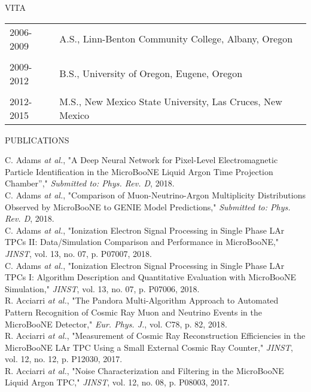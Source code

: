 \begin{center}
            VITA
\end{center}
\begin{flushleft}
\begin{tabular}{ll}
2006-2009        &  A.S., Linn-Benton Community College, Albany, Oregon
\\
& \\
2009-2012        &  B.S., University of Oregon, Eugene, Oregon
\\
& \\
2012-2015        &  M.S., New Mexico State University, Las Cruces, New Mexico
\end{tabular}
\end{flushleft}
\vspace{0.1in}
\begin{center}PUBLICATIONS
\end{center}
  C. Adams \textit{at al.}, "A Deep Neural Network for Pixel-Level Electromagnetic Particle Identification in the MicroBooNE Liquid Argon Time Projection Chamber”," \textit{Submitted to: Phys. Rev. D}, 2018. \\
  C. Adams \textit{at al.}, "Comparison of Muon-Neutrino-Argon Multiplicity Distributions Observed by MicroBooNE to GENIE Model Predictions," \textit{Submitted to: Phys. Rev. D}, 2018. \\
  C. Adams \textit{at al.}, "Ionization Electron Signal Processing in Single Phase LAr TPCs II: Data/Simulation Comparison and Performance in MicroBooNE," \textit{JINST}, vol. 13, no. 07, p. P07007, 2018. \\
  C. Adams \textit{at al.}, "Ionization Electron Signal Processing in Single Phase LAr TPCs I: Algorithm Description and Quantitative Evaluation with MicroBooNE Simulation," \textit{JINST}, vol. 13, no. 07, p. P07006, 2018. \\
  R. Acciarri \textit{at al.}, "The Pandora Multi-Algorithm Approach to Automated Pattern Recognition of Cosmic Ray Muon and Neutrino Events in the MicroBooNE Detector," \textit{Eur. Phys. J.}, vol. C78, p. 82, 2018. \\
  R. Acciarri \textit{at al.}, "Measurement of Cosmic Ray Reconstruction Efficiencies in the MicroBooNE LAr TPC Using a Small External Cosmic Ray Counter," \textit{JINST}, vol. 12, no. 12, p. P12030, 2017. \\
  R. Acciarri \textit{at al.}, "Noise Characterization and Filtering in the MicroBooNE Liquid Argon TPC," \textit{JINST}, vol. 12, no. 08, p. P08003, 2017. \\
